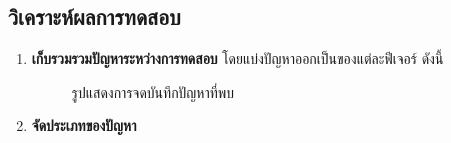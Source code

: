 \subsection{วิเคราะห์ผลการทดสอบ}
\begin{enumerate}
    \item \textbf{เก็บรวมรวมปัญหาระหว่างการทดสอบ} โดยแบ่งปัญหาออกเป็นของแต่ละฟีเจอร​์ ดังนี้
    \begin{figure}[H]\centering
        \caption{รูปแสดงการจดบันทึกปัญหาที่พบ}\label{fig:GateringIssue}
    \end{figure}
    \item \textbf{จัดประเภทของปัญหา}
    \begin{figure}[H]\centering

\end{figure}
\end{enumerate}
